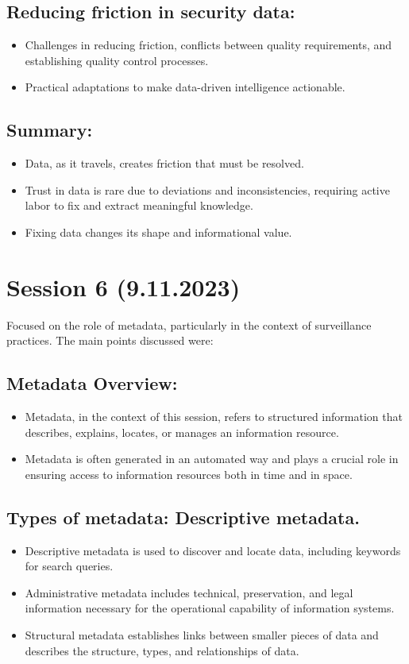 \documentclass{article}
\begin{document}
\subsection*{Reducing friction in security data:}
\begin{itemize}
    \item Challenges in reducing friction, conflicts between quality requirements, and establishing quality control processes.
    \item Practical adaptations to make data-driven intelligence actionable.
\end{itemize}

\subsection*{Summary:}
\begin{itemize}
    \item Data, as it travels, creates friction that must be resolved.
    \item Trust in data is rare due to deviations and inconsistencies, requiring active labor to fix and extract meaningful knowledge.
    \item Fixing data changes its shape and informational value.
\end{itemize}

\section*{Session 6 (9.11.2023)}
Focused on the role of metadata, particularly in the context of surveillance practices. The main points discussed were:
\subsection*{Metadata Overview:}
\begin{itemize}
    \item Metadata, in the context of this session, refers to structured information that describes, explains, locates, or manages an information resource.
    \item Metadata is often generated in an automated way and plays a crucial role in ensuring access to information resources both in time and in space.
\end{itemize}

\subsection*{Types of metadata: Descriptive metadata.}
\begin{itemize}
    \item Descriptive metadata is used to discover and locate data, including keywords for search queries.
    \item Administrative metadata includes technical, preservation, and legal information necessary for the operational capability of information systems.
    \item Structural metadata establishes links between smaller pieces of data and describes the structure, types, and relationships of data.
\end{itemize}
\end{document}
